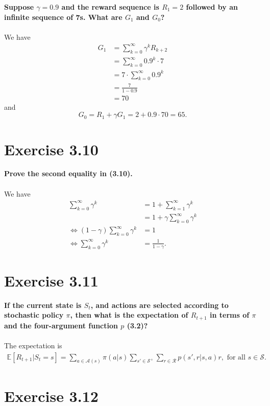 \documentclass[a4paper,11pt]{article}
\numberwithin{equation}{section}
\theoremstyle{remark}
\newcommand{\E}{\mathbb E}
\begin{document}
\textbf{Suppose $\gamma = 0.9$ and the reward sequence is $R_1 = 2$ followed by an infinite sequence of 7s. What are $G_1$ and $G_0$?}
\\ \\
We have 
\begin{align*}
	G_1 & = \sum_{k=0}^{\infty} \gamma^{k} R_{k+2} \\
		& = \sum_{k=0}^{\infty} 0.9^k \cdot 7 \\
		& = 7 \cdot \sum_{k=0}^{\infty} 0.9^k \\
		& = \frac{7}{1 - 0.9} \\
		& = 70
\end{align*}
and 
\[
	G_0 = R_1 + \gamma G_1 = 2 + 0.9 \cdot 70 = 65.
\]

\section{Exercise 3.10}

\textbf{Prove the second equality in (3.10).}
\\ \\
We have 
\begin{align*}
	\sum_{k=0}^{\infty} \gamma^k & = 1 + \sum_{k=1}^{\infty} \gamma^k \\
	& = 1 + \gamma \sum_{k=0}^{\infty} \gamma^k \\
	\iff (1 - \gamma) \sum_{k=0}^{\infty} \gamma^k & = 1 \\	
	\iff \sum_{k=0}^{\infty} \gamma^k & = \frac{1}{1 - \gamma}.	
\end{align*}


\section{Exercise 3.11}

\textbf{If the current state is $S_t$, and actions are selected according to stochastic policy $\pi$, then what is the expectation of $R_{t+1}$ in terms of $\pi$ and the four-argument function $p$ (3.2)?}
\\ \\
The expectation is 
\begin{align*}
	\E[R_{t+1}|S_t = s] = \sum_{a \in \mathcal{A}(s)}^{} \pi(a|s) \sum_{s' \in \mathcal{S}^+}^{} \sum_{r \in \mathcal{R}}^{} p(s', r| s, a) 
	r, \text{ for all } s \in \mathcal{S}.
\end{align*}

\section{Exercise 3.12}
\end{document}

